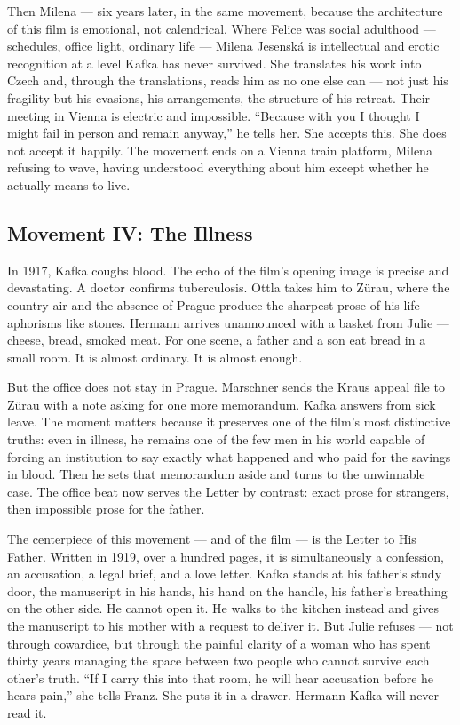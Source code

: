Then Milena --- six years later, in the same movement, because the architecture of this film is emotional, not calendrical. Where Felice was social adulthood --- schedules, office light, ordinary life --- Milena Jesenská is intellectual and erotic recognition at a level Kafka has never survived. She translates his work into Czech and, through the translations, reads him as no one else can --- not just his fragility but his evasions, his arrangements, the structure of his retreat. Their meeting in Vienna is electric and impossible. ``Because with you I thought I might fail in person and remain anyway,'' he tells her. She accepts this. She does not accept it happily. The movement ends on a Vienna train platform, Milena refusing to wave, having understood everything about him except whether he actually means to live.

\subsection{Movement IV: The Illness}

In 1917, Kafka coughs blood. The echo of the film's opening image is precise and devastating. A doctor confirms tuberculosis. Ottla takes him to Zürau, where the country air and the absence of Prague produce the sharpest prose of his life --- aphorisms like stones. Hermann arrives unannounced with a basket from Julie --- cheese, bread, smoked meat. For one scene, a father and a son eat bread in a small room. It is almost ordinary. It is almost enough.

But the office does not stay in Prague. Marschner sends the Kraus appeal file to Zürau with a note asking for one more memorandum. Kafka answers from sick leave. The moment matters because it preserves one of the film's most distinctive truths: even in illness, he remains one of the few men in his world capable of forcing an institution to say exactly what happened and who paid for the savings in blood. Then he sets that memorandum aside and turns to the unwinnable case. The office beat now serves the Letter by contrast: exact prose for strangers, then impossible prose for the father.

The centerpiece of this movement --- and of the film --- is the Letter to His Father. Written in 1919, over a hundred pages, it is simultaneously a confession, an accusation, a legal brief, and a love letter. Kafka stands at his father's study door, the manuscript in his hands, his hand on the handle, his father's breathing on the other side. He cannot open it. He walks to the kitchen instead and gives the manuscript to his mother with a request to deliver it. But Julie refuses --- not through cowardice, but through the painful clarity of a woman who has spent thirty years managing the space between two people who cannot survive each other's truth. ``If I carry this into that room, he will hear accusation before he hears pain,'' she tells Franz. She puts it in a drawer. Hermann Kafka will never read it.

